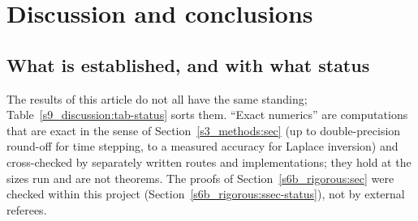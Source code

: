 \section{Discussion and conclusions}\label{s9_discussion:sec}

\subsection{What is established, and with what status}\label{s9_discussion:ssec-status}

The results of this article do not all have the same standing; Table~\ref{s9_discussion:tab-status} sorts them.
``Exact numerics'' are computations that are exact in the sense of Section~\ref{s3_methods:sec} (up to double-precision
round-off for time stepping, to a measured accuracy for Laplace inversion) and cross-checked by separately written routes and
implementations; they hold at the sizes run and are not theorems. The proofs of
Section~\ref{s6b_rigorous:sec} were checked within this project (Section~\ref{s6b_rigorous:ssec-status}), not by external
referees.

